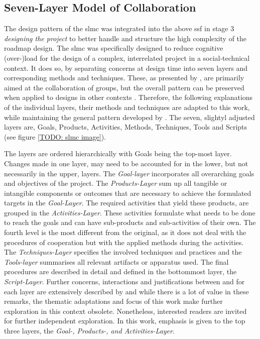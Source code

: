 \subsection{Seven-Layer Model of Collaboration}\label{subsec:slmc}

The design pattern of the \acrshort*{slmc} was integrated into the above \acrshort*{ssf} in stage 3 \textit{designing the project} to better handle and structure the high complexity of the roadmap design. The \acrshort*{slmc} was specifically designed to reduce cognitive (over-)load for the design of a complex, interrelated project in a social-technical context. It does so, by separating concerns at design time into seven layers and  corresponding methods and techniques. These, as presented by \autocite{briggsSevenLayerModelCollaboration}, are primarily aimed at the collaboration of groups, but the overall pattern can be preserved when applied to designs in other contexts \autocite{diggelenGroundedDesignDesign2009}. Therefore, the following explanations of the individual layers, their methods and techniques are adapted to this work, while maintaining the general pattern developed by \autocite{briggsSevenLayerModelCollaboration}. The seven, slightyl adjusted layers are, Goals, Products, Activities, Methods, Techniques, Tools and Scripts (see figure \ref*{TODO: slmc image}). 


The layers are ordered hierarchically with Goals being the top-most layer. Changes made in one layer, may need to be accounted for in the lower, but not necessarily in the upper, layers. The \textit{Goal-layer} incorporates all overarching goals and objectives of the project. The \textit{Products-Layer} sum up all tangible or intangible components or outcomes that are necessary to achieve the formulated targets in the \textit{Goal-Layer}. The required activities that yield these products, are grouped in the \textit{Activities-Layer}. These activities formulate what needs to be done to reach the goals and can have sub-products and sub-activities of their own. The fourth level is the most different from the original, as it does not deal with the procedures of cooperation but with the applied methods during the activities. The \textit{Techniques-Layer} specifies the involved techniques and practices and the \textit{Tools-layer} summarises all relevant artifacts or apparatus used. The final procedures are described in detail and defined in the bottommost layer, the \textit{Script-Layer}. Further concerns, interactions and justifications between and for each layer are extensively described by \autocite{briggsSevenLayerModelCollaboration} and while there is a lot of value in these remarks, the thematic adaptations and focus of this work make further exploration in this context obsolete. Nonetheless, interested readers are invited for further independent exploration. In this work, emphasis is given to the top three layers, the \textit{Goal-, Products-, and Activities-Layer}.%


